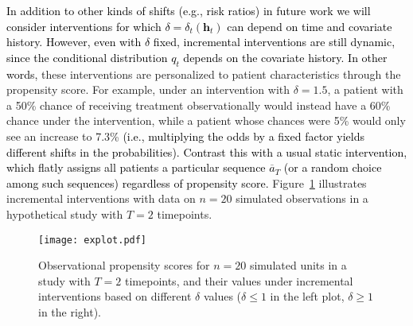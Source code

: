 \documentclass[12pt]{article}
\newcommand{\bh}{\mathbf{h}}
\theoremstyle{remark}
\begin{document}
\textcolor{black}{In addition to other kinds of shifts (e.g., risk ratios) in future work we will consider interventions for which $\delta=\delta_t(\bh_t)$ can depend on time and covariate history. However, even with $\delta$ fixed, incremental interventions are still dynamic, since the conditional distribution $q_t$ depends on the covariate history. In other words,} these interventions are personalized to patient characteristics through the propensity score. For example, under an intervention with $\delta=1.5$, a patient with a 50\% chance of receiving treatment observationally would instead have a 60\% chance under the intervention, while a patient whose chances were 5\%  would only see an increase to 7.3\% \textcolor{black}{(i.e., multiplying the odds by a fixed factor yields different shifts in the probabilities). Contrast this with a usual static intervention, which flatly assigns all patients a particular sequence $\overline{a}_T$ (or a random choice among such sequences) regardless of propensity score.} Figure~\ref{fig:explot} illustrates  incremental interventions with data on $n=20$ simulated observations in a hypothetical study with $T=2$ timepoints. 



\begin{figure}[h!]
\begin{center}
\texttt{[image: explot.pdf]}
\caption{Observational propensity scores for $n=20$ simulated units in a study with $T=2$ timepoints, and their values under incremental interventions based on different $\delta$ values ($\delta \leq 1$ in the left plot, $\delta \geq 1$ in the right).} \label{fig:explot}
\end{center}
\end{figure}
\end{document}
